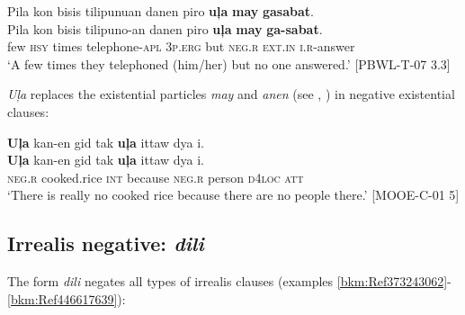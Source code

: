 \ea
\label{bkm:Ref373140065}
Pila  kon  bisis  tilipunuan  danen  piro  \textbf{uļa}  \textbf{may}  \textbf{gasabat}. \\\smallskip
\gll Pila  kon  bisis  tilipuno-an  danen  piro  \textbf{uļa}  \textbf{may}  \textbf{ga-sabat}. \\
few  \textsc{hsy}  times  telephone-\textsc{apl}  3\textsc{p.erg}  but  \textsc{neg.r}  \textsc{ext.in}  \textsc{i.r}-answer \\
\glt ‘A few times they telephoned (him/her) but no one answered.’ [PBWL-T-07 3.3]
\z

\textit{Uļa} replaces the existential particles \textit{may} and \textit{anen} (see , ) in negative existential clauses:

\ea
\textbf{Uļa}  kan-en  gid  tak  \textbf{uļa}  ittaw  dya  i. \\\smallskip
\gll \textbf{Uļa}  kan-en  gid  tak  \textbf{uļa}  ittaw  dya  i. \\
\textsc{neg.r}  cooked.rice  \textsc{int}  because  \textsc{neg.r}  person  \textsc{d}4\textsc{loc}  \textsc{att} \\
\glt ‘There is really no cooked rice because there are no people there.’ [MOOE-C-01 5]
\z
\subsection{ Irrealis negative: \textit{dili}}
\label{bkm:Ref446684276} 
The form \textit{dili} negates all types of irrealis clauses (examples \ref{bkm:Ref373243062}{}-\ref{bkm:Ref446617639}):

